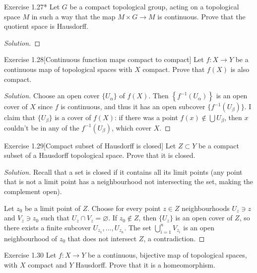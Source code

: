 \begin{thing4}{Exercise 1.27*}\label{exer:1.27}\leavevmode
Let $G$ be a compact topological group, acting on a topological space $M$ in such a way that the map $M \times G \longrightarrow M$ is continuous. Prove that the quotient space is Hausdorff.
\end{thing4}

\begin{proof}[Solution]\leavevmode
\end{proof}


\begin{thing4}{Exercise 1.28}[Continuous function maps compact to compact]\label{exer:1.28}\leavevmode
Let $f:X\to Y$ be a continuous map of topological spaces with $X$ compact. Prove that $f(X)$ is also compact.
\end{thing4}

\begin{proof}[Solution]\leavevmode
	Choose an open cover $\{U_\alpha\}$ of $f(X)$. Then  $\left\{f^{-1}\left( U_\alpha \right) \right\}$ is an open cover of $X$ since $f$ is continuous, and thus it has an open subcover $\{f^{-1}(U_\beta)\}$. I claim that $\{U_\beta\}$ is a cover of $f(X)$: if there was a point $f(x) \not \in \bigcup U_\beta $, then $x$ couldn't be in any of the  $f^{-1}(U_\beta)$, which cover $X$. 
\end{proof}

\begin{thing4}{Exercise 1.29}[Compact subset of Hausdorff is closed]\label{exer:1.29}\leavevmode
Let $Z \subset Y$ be a compact subset of a Hausdorff topological space. Prove that it is closed.
\end{thing4}

\begin{proof}[Solution]\leavevmode
Recall that a set is closed if it contains all its limit points (any point that is not a limit point has a neighbourhood not intersecting the set, making the complement open).

Let $z_0$ be a limit point of $Z$. Choose for every point $z \in Z$ neighbourhoods $U_z \ni z$ and $V_z \ni z_0$ such that $U_z \cap V_z=\varnothing$. If $z_0 \not\in Z$, then $\{U_z\}$ is an open cover of $Z$, so there exists a finite subcover $U_{z_1},\ldots,U_{z_n}$. The set $\bigcup_{i=1}^n V_{z_i}$ is an open neighbourhood of $z_0$ that does not intersect $Z$, a contradiction.
\end{proof}

\begin{thing4}{Exercise 1.30}\label{exer:1.30}\leavevmode
Let $f:X \to Y$ be a continuous, bijective map of topological spaces, with $X$ compact and $Y$ Hausdorff. Prove that it is a homeomorphism.
\end{thing4}

